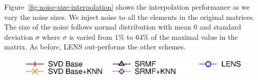 
Figure~\ref{fig:noise-size-interpolation} shows the interpolation
performance as we vary the noise sizes. We inject noise to all the 
elements in the original matrices. The size of the noise follows 
normal distribution with mean $0$ and standard deviation $\sigma$
where $\sigma$ is varied from $1\%$ to $64\%$ of the maximal value
in the matrix. As before, LENS out-performs the other schemes. 

\begin{figure}[h!]
  \centering
  \includegraphics[width=1\columnwidth]{fig/legend.eps}
\end{figure}
